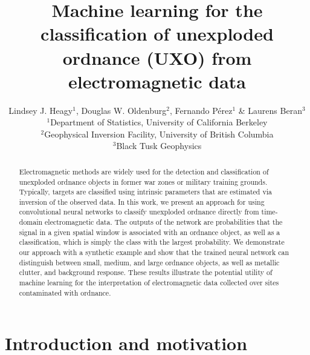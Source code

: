 \documentclass{segabs}
\begin{document}
\title{Machine learning for the classification of unexploded ordnance (UXO) from electromagnetic data}

\author{
    Lindsey J. Heagy$^1$, Douglas W. Oldenburg$^2$, Fernando P\'erez$^1$ \& Laurens Beran$^3$ \\
    $^1$Department of Statistics, University of California Berkeley \\
    $^2$Geophysical Inversion Facility, University of British Columbia \\
    $^3$Black Tusk Geophysics
}


\maketitle

\begin{abstract}
\vspace{-0.6cm}

Electromagnetic methods are widely used for the detection and classification of unexploded ordnance objects in former war zones or military training grounds. Typically, targets are classified using intrinsic parameters that are estimated via inversion of the observed data. In this work, we present an approach for using convolutional neural networks to classify unexploded ordnance directly from time-domain electromagnetic data. The outputs of the network are probabilities that the signal in a given spatial window is associated with an ordnance object, as well as a classification, which is simply the class with the largest probability. We demonstrate our approach with a synthetic example and show that the trained neural network can distinguish between small, medium, and large ordnance objects, as well as metallic clutter, and background response. These results illustrate the potential utility of machine learning for the interpretation of electromagnetic data collected over sites contaminated with ordnance.

\end{abstract}

\vspace{-0.45cm}
\section{Introduction and motivation}
\vspace{-0.25cm}
\end{document}
